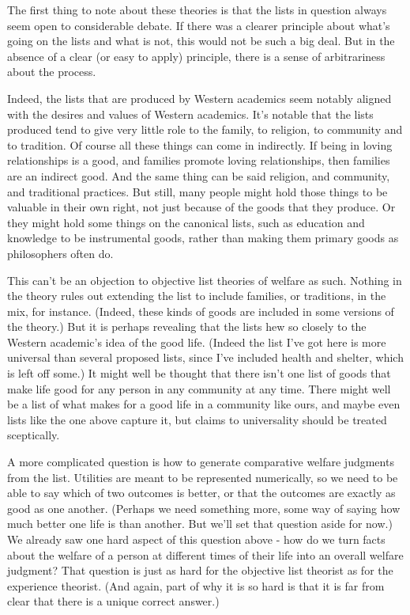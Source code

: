 The first thing to note about these theories is that the lists in question always seem open to considerable debate. If there was a clearer principle about what's going on the lists and what is not, this would not be such a big deal. But in the absence of a clear (or easy to apply) principle, there is a sense of arbitrariness about the process.

Indeed, the lists that are produced by Western academics seem notably aligned with the desires and values of Western academics. It's notable that the lists produced tend to give very little role to the family, to religion, to community and to tradition. Of course all these things can come in indirectly. If being in loving relationships is a good, and families promote loving relationships, then families are an indirect good. And the same thing can be said religion, and community, and traditional practices. But still, many people might hold those things to be valuable in their own right, not just because of the goods that they produce. Or they might hold some things on the canonical lists, such as education and knowledge to be instrumental goods, rather than making them primary goods as philosophers often do.

This can't be an objection to objective list theories of welfare as such. Nothing in the theory rules out extending the list to include families, or traditions, in the mix, for instance. (Indeed, these kinds of goods are included in some versions of the theory.) But it is perhaps revealing that the lists hew so closely to the Western academic's idea of the good life. (Indeed the list I've got here is more universal than several proposed lists, since I've included health and shelter, which is left off some.) It might well be thought that there isn't one list of goods that make life good for any person in any community at any time. There might well be a list of what makes for a good life in a community like ours, and maybe even lists like the one above capture it, but claims to universality should be treated sceptically.

A more complicated question is how to generate comparative welfare judgments from the list. Utilities are meant to be represented numerically, so we need to be able to say which of two outcomes is better, or that the outcomes are exactly as good as one another. (Perhaps we need something more, some way of saying how much better one life is than another. But we'll set that question aside for now.) We already saw one hard aspect of this question above - how do we turn facts about the welfare of a person at different times of their life into an overall welfare judgment? That question is just as hard for the objective list theorist as for the experience theorist. (And again, part of why it is so hard is that it is far from clear that there is a unique correct answer.)

